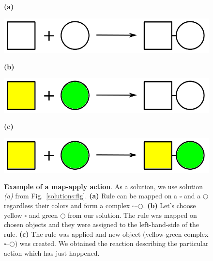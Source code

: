 \documentclass[12pt]{fithesis2}
\begin{document}
\begin{figure}
\begin{center}
\begin{minipage}[l]{0.1\textwidth}
    \textbf{(a)}
  \end{minipage}
  \begin{minipage}[r]{0.6\textwidth}
    {\hspace*{1.3cm}\includegraphics[scale=0.2]{pics/rule_complex}}
\end{minipage}

\begin{minipage}[l]{0.1\textwidth}
    \textbf{(b)}
  \end{minipage}
  \begin{minipage}[r]{0.6\textwidth}
    {\hspace*{1.3cm}\includegraphics[scale=0.2]{pics/rule_complex_mapped}}
\end{minipage}

\begin{minipage}[l]{0.1\textwidth}
    \textbf{(c)}
  \end{minipage}
  \begin{minipage}[r]{0.6\textwidth}
    {\hspace*{1.3cm}\includegraphics[scale=0.2]{pics/rule_reaction}}
\end{minipage}
\caption{\textbf{Example of a map-apply action}. As a solution, we use solution \textit{(a)} from Fig.~\ref{solutions:fig}. \textbf{(a)} Rule can be mapped on a $\square$ and a $\bigcirc$ regardless their colors and form a complex $\square$--$\bigcirc$.  \textbf{(b)} Let's choose yellow $\square$ and green $\bigcirc$ from our solution. The rule was mapped on chosen objects and they were assigned to the left-hand-side of the rule. \textbf{(c)} The rule was applied and new object (yellow-green complex $\square$--$\bigcirc$) was created. We obtained the reaction describing the particular action which has just happened.}
\label{map-apply:fig}
\end{center}
\end{figure}
\end{document}
